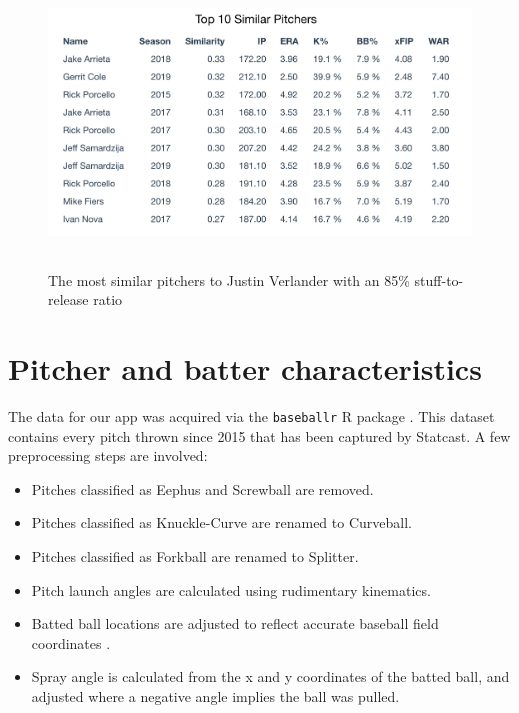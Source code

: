 \documentclass[11pt]{article}
\begin{document}
\begin{figure}
\centering
    \includegraphics[width=6in, height=3in]{verlander_similar.png}
    \caption{The most similar pitchers to Justin Verlander with an 85\% stuff-to-release ratio}
    \label{synthpitcher}
\end{figure}



\section{Pitcher and batter characteristics}

The data for our app was acquired via the \texttt{baseballr} R package \citep{baseballr}. This dataset contains every pitch thrown since 2015 that has been captured by Statcast. A few preprocessing steps are involved:
\begin{itemize}
    \item Pitches classified as Eephus and Screwball are removed.
    \item Pitches classified as Knuckle-Curve are renamed to Curveball.
    \item Pitches classified as Forkball are renamed to Splitter.
    \item Pitch launch angles are calculated using rudimentary kinematics.
    \item Batted ball locations are adjusted to reflect accurate baseball field coordinates \citep{petti2017research}.
    \item Spray angle is calculated from the x and y coordinates of the batted ball, and adjusted where a negative angle implies the ball was pulled.
\end{itemize}
\end{document}
